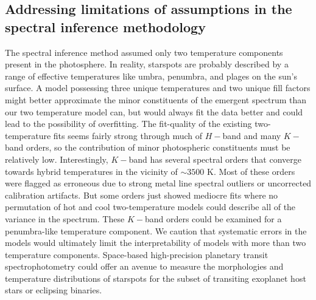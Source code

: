 \documentclass[12pt]{report}
\begin{document}
\subsection{Addressing limitations of assumptions in the spectral inference methodology}

The spectral inference method assumed only two temperature components present in the photosphere.  In reality, starspots are probably described by a range of effective temperatures like umbra, penumbra, and plages on the sun's surface.  A model possessing three unique temperatures and two unique fill factors might better approximate the minor constituents of the emergent spectrum than our two temperature model can, but would always fit the data better and could lead to the possibility of overfitting.  The fit-quality of the existing two-temperature fits seems fairly strong through much of $H-$band and many $K-$band orders, so the contribution of minor photospheric constituents must be relatively low.  Interestingly, $K-$band has several spectral orders that converge towards hybrid temperatures in the vicinity of $\sim3500$ K.  Most of these orders were flagged as erroneous due to strong metal line spectral outliers or uncorrected calibration artifacts.  But some orders just showed mediocre fits where no permutation of hot and cool two-temperature models could describe all of the variance in the spectrum.  These $K-$band orders could be examined for a penumbra-like temperature component.  We caution that systematic errors in the models would ultimately limit the interpretability of models with more than two temperature components.  Space-based high-precision planetary transit spectrophotometry could offer an avenue to measure the morphologies and temperature distributions of starspots for the subset of transiting exoplanet host stars or eclipsing binaries.
\end{document}
